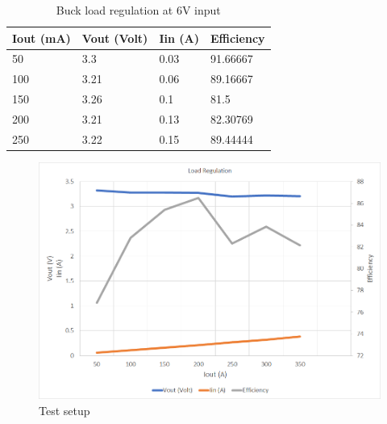 \begin{table}[H]
\centering
\begin{tabular}{|l|l|l|l|}
\hline
Iout (mA) & Vout (Volt) & Iin (A) & Efficiency \\ \hline
50        & 3.3         & 0.03    & 91.66667   \\ \hline
100       & 3.21        & 0.06    & 89.16667   \\ \hline
150       & 3.26        & 0.1     & 81.5       \\ \hline
200       & 3.21        & 0.13    & 82.30769   \\ \hline
250       & 3.22        & 0.15    & 89.44444   \\ \hline
\end{tabular}
\caption{Buck load regulation at 6V input}
\label{table:4}
\end{table}
\begin{figure}[H]
	\centering
	\includegraphics[width=\columnwidth]{IMGS/Buck load regulation at 3.6V input.png}
	\caption{Test setup}
	\label{fig:arch}
\end{figure}



